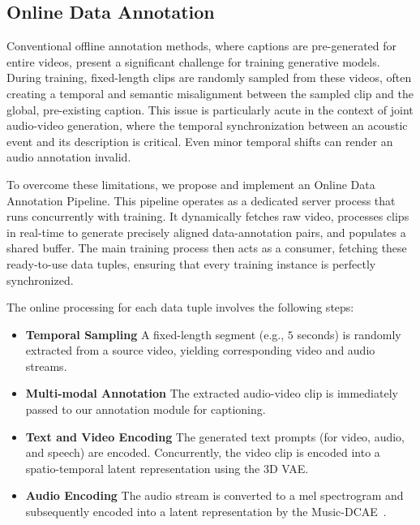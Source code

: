 \subsection{Online Data Annotation}
Conventional offline annotation methods, where captions are pre-generated for entire videos, present a significant challenge for training generative models. During training, fixed-length clips are randomly sampled from these videos, often creating a temporal and semantic misalignment between the sampled clip and the global, pre-existing caption. This issue is particularly acute in the context of joint audio-video generation, where the temporal synchronization between an acoustic event and its description is critical. Even minor temporal shifts can render an audio annotation invalid.

To overcome these limitations, we propose and implement an Online Data Annotation Pipeline. This pipeline operates as a dedicated server process that runs concurrently with training. It dynamically fetches raw video, processes clips in real-time to generate precisely aligned data-annotation pairs, and populates a shared buffer. The main training process then acts as a consumer, fetching these ready-to-use data tuples, ensuring that every training instance is perfectly synchronized.

The online processing for each data tuple involves the following steps:
\begin{itemize}[leftmargin=*]
    \item \textbf{Temporal Sampling} A fixed-length segment (e.g., $5$ seconds) is randomly extracted from a source video, yielding corresponding video and audio streams.
    \item \textbf{Multi-modal Annotation} The extracted audio-video clip is immediately passed to our annotation module for captioning.
    \item \textbf{Text and Video Encoding} The generated text prompts (for video, audio, and speech) are encoded. Concurrently, the video clip is encoded into a spatio-temporal latent representation using the 3D VAE.
    \item \textbf{Audio Encoding} The audio stream is converted to a mel spectrogram and subsequently encoded into a latent representation by the Music-DCAE~\cite{chen2024deep}.
\end{itemize}

